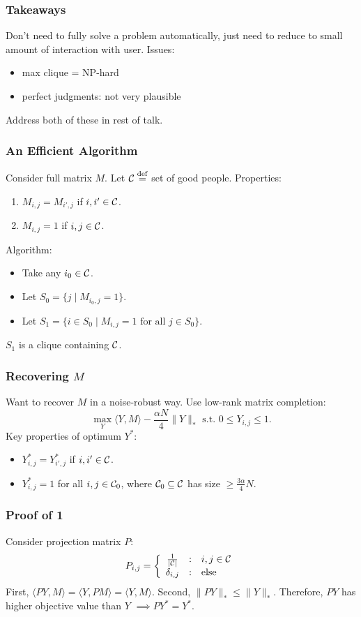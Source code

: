 \documentclass{beamer}
\begin{document}
\begin{frame}
\frametitle{Takeaways}
Don't need to fully solve a problem automatically, just need to 
reduce to small amount of interaction with user.
\pause
\vskip 0.2in
Issues:
\begin{itemize}
\item max clique = NP-hard
\item perfect judgments: not very plausible
\end{itemize}
Address both of these in rest of talk.
\end{frame}

\begin{frame}
\frametitle{An Efficient Algorithm}
Consider full matrix $M$. Let $\mathcal{C} \stackrel{\mathrm{def}}{=}$ set of good people.
\pause
\vskip 0.2in
Properties:
\begin{enumerate}
\item $M_{i,j} = M_{i',j}$ if $i,i' \in \mathcal{C}$.
\item $M_{i,j} = 1$ if $i,j \in \mathcal{C}$.
\end{enumerate}
\pause
\vskip 0.2in
Algorithm:
\begin{itemize}
\item Take any $i_0 \in \mathcal{C}$.
\item Let $S_0 = \{j \mid M_{i_0,j} = 1\}$.
\item Let $S_1 = \{i \in S_0 \mid M_{i,j} = 1\text{ for all }j \in S_0\}$.
\end{itemize}
\pause
$S_1$ is a clique containing $\mathcal{C}$.
\end{frame}

\begin{frame}
\frametitle{Recovering $M$}
Want to recover $M$ in a noise-robust way. Use 
low-rank matrix completion:
\[ \max_{Y} \langle Y, M \rangle - \frac{\alpha N}{4}\|Y\|_* \text{ s.t. } 0 \leq Y_{i,j} \leq 1. \]
\pause
Key properties of optimum $Y^*$:
\begin{itemize}
\item $Y^*_{i,j} = Y^*_{i',j}$ if $i,i' \in \mathcal{C}$.
\item $Y^*_{i,j} = 1$ for all $i,j \in \mathcal{C}_0$, where $\mathcal{C}_0 \subseteq \mathcal{C}$ has size $\geq \frac{3\alpha}{4}N$.
\end{itemize}
\end{frame}

\begin{frame}
\frametitle{Proof of 1}
Consider projection matrix $P$:
\[ P_{i,j} = \left\{ \begin{array}{ccl} \frac{1}{|\mathcal{C}|} & : & i,j \in \mathcal{C} \\ \delta_{i,j} & : & \text{else} \end{array} \right. \]
\pause
First, $\langle PY, M \rangle = \langle Y, PM \rangle = \langle Y, M \rangle$.
\pause \vskip 0.1in
Second, $\|PY\|_* \leq \|Y\|_*$.
\pause \vskip 0.2in
Therefore, $PY$ has higher objective value than $Y$ $\implies PY^* = Y^*$.
\end{frame}
\end{document}
